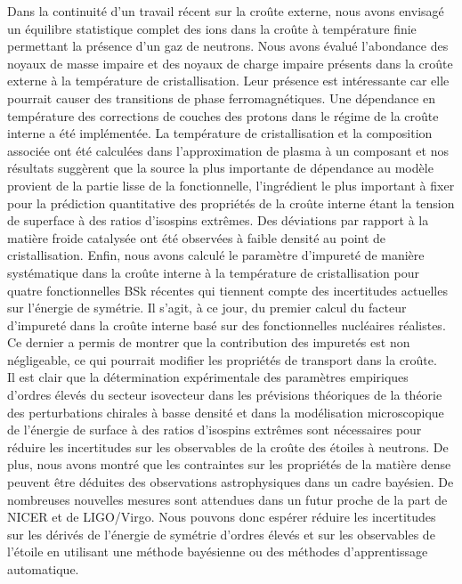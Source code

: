 Dans la continuité d'un travail récent sur la croûte externe, nous avons 
envisagé un équilibre statistique complet des ions dans la croûte à température 
finie permettant la présence d'un gaz de neutrons. Nous avons évalué 
l'abondance des noyaux de masse impaire et des noyaux de charge impaire 
présents dans la croûte externe à la température de cristallisation. 
Leur présence est intéressante car elle pourrait causer des transitions de
phase ferromagnétiques.
%
Une dépendance en température des corrections de couches des protons dans le 
régime de la croûte interne a été implémentée. La température de 
cristallisation et la composition associée ont été calculées dans 
l'approximation de plasma à un composant et nos résultats suggèrent que la 
source la plus importante de dépendance au modèle provient de la partie lisse 
de la fonctionnelle, l'ingrédient le plus important à fixer pour la 
prédiction quantitative des propriétés de la croûte interne étant la tension de 
superface à des ratios d'isospins extrêmes. 
%
Des déviations par rapport à la matière froide catalysée ont été observées à 
faible densité au point de cristallisation. 
Enfin, nous avons calculé le paramètre d'impureté de manière systématique dans
la croûte interne à la température de cristallisation pour quatre 
fonctionnelles BSk récentes qui tiennent compte des incertitudes actuelles sur 
l'énergie de symétrie. 
Il s'agit, à ce jour, du premier calcul du facteur d'impureté dans la croûte
interne basé sur des fonctionnelles nucléaires réalistes. Ce dernier a permis
de montrer que la contribution des impuretés est non négligeable, ce qui 
pourrait modifier les propriétés de transport dans la croûte.
\\

Il est clair que la détermination expérimentale des paramètres empiriques
d'ordres élevés du secteur isovecteur dans les prévisions théoriques de 
la théorie des perturbations chirales à basse densité et dans la modélisation
microscopique de l'énergie de surface à des ratios d'isospins extrêmes 
sont nécessaires pour réduire les incertitudes sur les observables de la croûte 
des étoiles à neutrons. 
%
De plus, nous avons montré que les contraintes sur les propriétés de la matière 
dense peuvent être déduites des observations astrophysiques dans un cadre 
bayésien. 
De nombreuses nouvelles mesures sont attendues dans un futur proche de la part
de NICER et de LIGO/Virgo. 
Nous pouvons donc espérer réduire les incertitudes sur les dérivés de l'énergie 
de symétrie d'ordres élevés et sur les observables de l'étoile en utilisant une 
méthode bayésienne ou des méthodes d'apprentissage automatique. 

